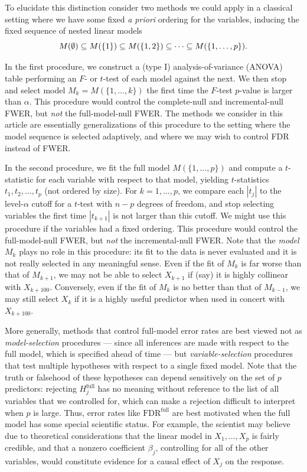\documentclass{article}
\begin{document}
To elucidate this distinction consider two methods we could apply in a classical setting where we have some fixed {\em a priori} ordering for the variables, inducing the fixed sequence of nested linear models
\[
M(\emptyset) \subseteq M(\{1\}) \subseteq M(\{1,2\}) \subseteq \cdots \subseteq M(\{1,\ldots, p\}).
\]

In the first procedure, we construct a (type I) analysis-of-variance (ANOVA) table performing an $F$- or $t$-test of each model against the next. We then stop and select model $M_k=M(\{1,\ldots,k\})$ the first time the $F$-test $p$-value is larger than $\alpha$. This procedure would control the complete-null and incremental-null FWER, but {\em not} the full-model-null FWER. The methods we consider in this article are essentially generalizations of this procedure to the setting where the model sequence is selected adaptively, and where we may wish to control FDR instead of FWER.

In the second procedure, we fit the full model $M(\{1,\ldots,p\})$ and compute a $t$-statistic for each variable with respect to that model, yielding $t$-statistics $t_1, t_2, \ldots, t_p$ (not ordered by size). For $k=1,\ldots,p$, we compare each $|t_j|$ to the level-$\alpha$ cutoff for a $t$-test with $n-p$ degrees of freedom, and stop selecting variables the first time $|t_{k+1}|$ is not larger than this cutoff. We might use this procedure if the variables had a  fixed ordering.
This procedure would control the full-model-null FWER, but {\em not} the incremental-null FWER. Note that the {\em model} $M_k$ plays no role in this procedure: its fit to the data is never evaluated and it is not really selected in any meaningful sense. Even if the fit of $M_k$ is far worse than that of $M_{k+1}$, we may not be able to select $X_{k+1}$ if (say) it is highly collinear with $X_{k+100}$. Conversely, even if the fit of $M_k$ is no better than that of $M_{k-1}$, we may still select $X_k$ if it is a highly useful predictor when used in concert with $X_{k+100}$.

More generally, methods that control full-model error rates are best viewed not as {\em model-selection} procedures --- since all inferences are made with respect to the full model, which is specified ahead of time --- but {\em variable-selection} procedures that test multiple hypotheses with respect to a single fixed model. Note that the truth or falsehood of these hypotheses can depend sensitively on the set of $p$ predictors: rejecting $H_j^{\text{full}}$ has no meaning without reference to the list of all variables that we controlled for, which can make a rejection difficult to interpret when $p$ is large. Thus, error rates like $\text{FDR}^{\text{full}}$ are best motivated when the full model has some special scientific status. For example, the scientist may believe due to theoretical considerations that the linear model in $X_1,\ldots,X_p$ is fairly credible, and that a nonzero coefficient $\beta_j$, controlling for all of the other variables, would constitute evidence for a causal effect of $X_j$ on the response.
\end{document}
